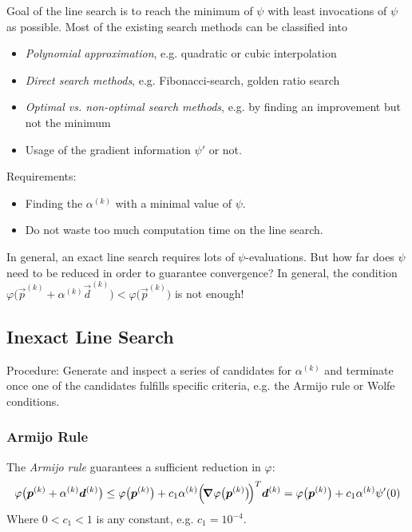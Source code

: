 		Goal of the line search is to reach the minimum of \(\psi\) with least invocations of \(\psi\) as possible. Most of the existing search methods can be classified into
		\begin{itemize}
			\item \emph{Polynomial approximation}, e.g. quadratic or cubic interpolation
			\item \emph{Direct search methods}, e.g. Fibonacci-search, golden ratio search
			\item \emph{Optimal vs. non-optimal search methods}, e.g. by finding an improvement but not the minimum
			\item Usage of the gradient information \( \psi' \) or not.
		\end{itemize}

		Requirements:
		\begin{itemize}
			\item Finding the \(\alpha^{(k)}\) with a minimal value of \(\psi\).
			\item Do not waste too much computation time on the line search.
		\end{itemize}
		In general, an exact line search requires lots of \(\psi\)-evaluations. But how far does \(\psi\) need to be reduced in order to guarantee convergence? In general, the condition \( \varphi\big(\vec{p}^{(k)} + \alpha^{(k)} \vec{d}^{(k)}\big) < \varphi\big(\vec{p}^{(k)}\big) \) is not enough!

		\subsection{Inexact Line Search}
			Procedure: Generate and inspect a series of candidates for \(\alpha^{(k)}\) and terminate once one of the candidates fulfills specific criteria, e.g. the Armijo rule or Wolfe conditions.

			\subsubsection{Armijo Rule}
				The \emph{Armijo rule} guarantees a sufficient reduction in \(\varphi\):
				\begin{align*}
					\varphi\big(\bm{p}^{(k)} + \alpha^{(k)} \bm{d}^{(k)}\big) \leq \varphi\big(\bm{p}^{(k)}\big) + c_1 \alpha^{(k)} \Big(\! \grad{\varphi}\big(\bm{p}^{(k)}\big) \!\Big)^T \bm{d}^{(k)} = \varphi\big(\bm{p}^{(k)}\big) + c_1 \alpha^{(k)} \psi'(0)
				\end{align*}
				Where \( 0 < c_1 < 1 \) is any constant, e.g. \( c_1 = 10^{-4} \).

